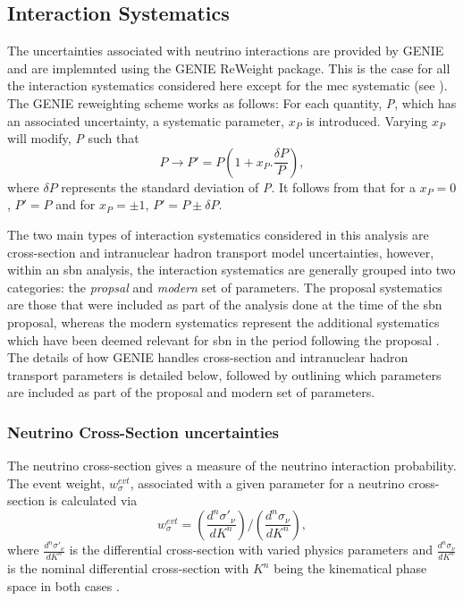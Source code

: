 \subsection{Interaction Systematics}\label{sec:interaction_syst}
The uncertainties associated with neutrino interactions are provided by GENIE and are implemnted using the GENIE ReWeight package. This is the case for all the interaction systematics considered here except for the \gls{mec} systematic (see ). The GENIE reweighting scheme works as follows: For each quantity, \textit{P}, which has an associated uncertainty, a systematic parameter, $x_P$ is introduced. Varying $x_P$ will modify, \textit{P} such that
\begin{equation}
    P \rightarrow P' = P (1 + x_P . \frac{\delta P}{P}),
\label{eqn:genie_reweight}
\end{equation}
where $\delta P$ represents the standard deviation of \textit{P}. It follows from  that for a $x_P = 0$, $P' = P$ and for $x_P = \pm 1$, $P' = P \pm \delta P$.

The two main types of interaction systematics considered in this analysis are cross-section and intranuclear hadron transport model uncertainties, however, within an \gls{sbn} analysis, the interaction systematics are generally grouped into two categories: the \textit{propsal} and \textit{modern} set of parameters. The proposal systematics are those that were included as part of the analysis done at the time of the \gls{sbn} proposal, whereas the modern systematics represent the additional systematics which have been deemed relevant for \gls{sbn} in the period following the proposal \cite{SBN_Proposal}. The details of how GENIE handles cross-section and intranuclear hadron transport parameters is detailed below, followed by outlining which parameters are included as part of the proposal and modern set of parameters.

\subsubsection*{Neutrino Cross-Section uncertainties}

The neutrino cross-section gives a measure of the neutrino interaction probability. The event weight, $w_{\sigma}^{evt}$, associated with a given parameter for a neutrino cross-section is calculated via
\begin{equation}
    w_\sigma^{evt} = \left(\frac{d^n\sigma'_\nu}{dK^n}\right)\Bigg/\left(\frac{d^n\sigma_\nu}{dK^n}\right),
\end{equation}
where $\frac{d^n\sigma'_\nu}{dK^n}$ is the differential cross-section with varied physics parameters and  $\frac{d^n\sigma_\nu}{dK^n}$ is the nominal differential cross-section with $K^n$ being the kinematical phase space in both cases \cite{GENIE_manual}.

